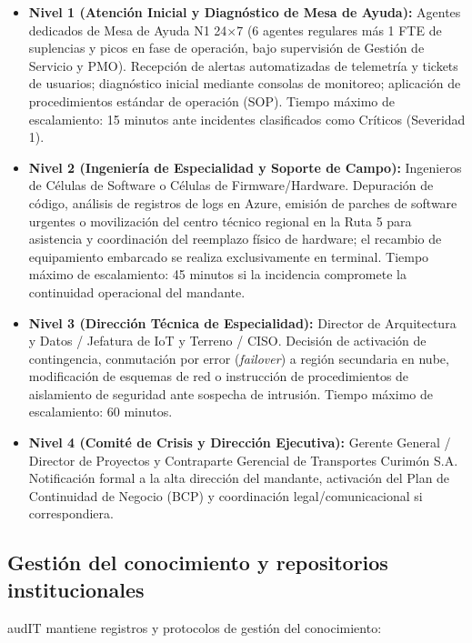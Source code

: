 \begin{itemize}
  \item \textbf{Nivel 1 (Atención Inicial y Diagnóstico de Mesa de Ayuda):} Agentes dedicados de Mesa de Ayuda N1 24$\times$7 (6 agentes regulares más 1 FTE de suplencias y picos en fase de operación, bajo supervisión de Gestión de Servicio y PMO). Recepción de alertas automatizadas de telemetría y tickets de usuarios; diagnóstico inicial mediante consolas de monitoreo; aplicación de procedimientos estándar de operación (SOP). Tiempo máximo de escalamiento: 15 minutos ante incidentes clasificados como Críticos (Severidad 1).
  \item \textbf{Nivel 2 (Ingeniería de Especialidad y Soporte de Campo):} Ingenieros de Células de Software o Células de Firmware/Hardware. Depuración de código, análisis de registros de logs en Azure, emisión de parches de software urgentes o movilización del centro técnico regional en la Ruta 5 para asistencia y coordinación del reemplazo físico de hardware; el recambio de equipamiento embarcado se realiza exclusivamente en terminal. Tiempo máximo de escalamiento: 45 minutos si la incidencia compromete la continuidad operacional del mandante.
  \item \textbf{Nivel 3 (Dirección Técnica de Especialidad):} Director de Arquitectura y Datos / Jefatura de IoT y Terreno / CISO. Decisión de activación de contingencia, conmutación por error (\textit{failover}) a región secundaria en nube, modificación de esquemas de red o instrucción de procedimientos de aislamiento de seguridad ante sospecha de intrusión. Tiempo máximo de escalamiento: 60 minutos.
  \item \textbf{Nivel 4 (Comité de Crisis y Dirección Ejecutiva):} Gerente General / Director de Proyectos y Contraparte Gerencial de Transportes Curimón S.A. Notificación formal a la alta dirección del mandante, activación del Plan de Continuidad de Negocio (BCP) y coordinación legal/comunicacional si correspondiera.
\end{itemize}

\subsection{Gestión del conocimiento y repositorios institucionales}\label{sec:1-conocimiento}

audIT mantiene registros y protocolos de gestión del conocimiento:

